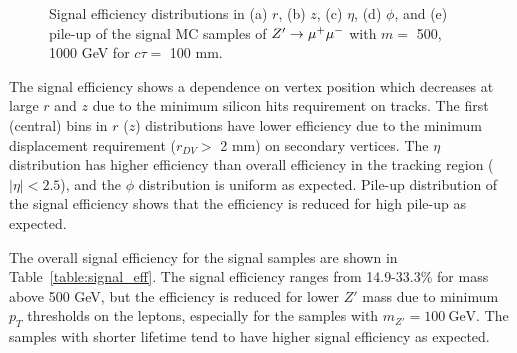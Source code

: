 \begin{figure}[!htb]
    \caption{Signal efficiency distributions in (a) $r$, (b) $z$, (c) $\eta$, (d) $\phi$, and (e) pile-up of the signal MC samples of $Z'\rightarrow \mu^{+}\mu^{-}$ with $m=$ 500, 1000 GeV for $c\tau=$ 100 mm.}
    \label{fig:signal_vertex_dist}
\end{figure}


The signal efficiency shows a dependence on vertex position which decreases at large $r$ and $z$ due to the minimum silicon hits requirement on tracks. The first (central) bins in $r$ ($z$) distributions have lower efficiency due to the minimum displacement requirement ($r_{DV} > $ 2 mm) on secondary vertices. The $\eta$ distribution has higher efficiency than overall efficiency in the tracking region ($|\eta| < 2.5$), and the $\phi$ distribution is uniform as expected. Pile-up distribution of the signal efficiency shows that the efficiency is reduced for high pile-up as expected.

The overall signal efficiency for the signal samples are shown in Table~\ref{table:signal_eff}. The signal efficiency ranges from 14.9-33.3\% for mass above 500 GeV, but the efficiency is reduced for lower $Z'$ mass due to minimum $p_{T}$ thresholds on the leptons, especially for the samples with $m_{Z'}=100~\si{\GeV}$. The samples with shorter lifetime tend to have higher signal efficiency as expected. 

